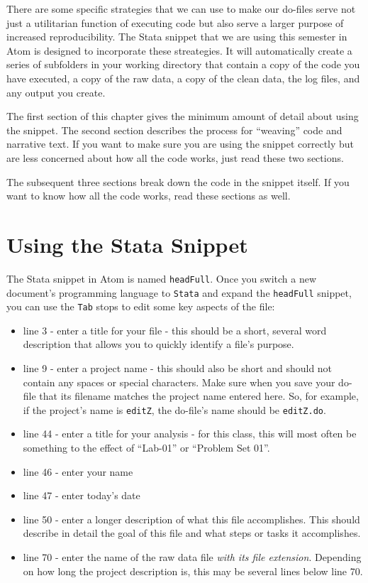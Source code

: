 \documentclass[]{book}
\providecommand{\tightlist}{%
  \setlength{\itemsep}{0pt}\setlength{\parskip}{0pt}}
\begin{document}
There are some specific strategies that we can use to make our do-files
serve not just a utilitarian function of executing code but also serve a
larger purpose of increased reproducibility. The Stata snippet that we
are using this semester in Atom is designed to incorporate these
streategies. It will automatically create a series of subfolders in your
working directory that contain a copy of the code you have executed, a
copy of the raw data, a copy of the clean data, the log files, and any
output you create.

The first section of this chapter gives the minimum amount of detail
about using the snippet. The second section describes the process for
``weaving'' code and narrative text. If you want to make sure you are
using the snippet correctly but are less concerned about how all the
code works, just read these two sections.

The subsequent three sections break down the code in the snippet itself.
If you want to know how all the code works, read these sections as well.

\section{Using the Stata Snippet}\label{using-the-stata-snippet}

The Stata snippet in Atom is named \texttt{headFull}. Once you switch a
new document's programming language to \texttt{Stata} and expand the
\texttt{headFull} snippet, you can use the \texttt{Tab} stops to edit
some key aspects of the file:

\begin{itemize}
\tightlist
\item
  line 3 - enter a title for your file - this should be a short, several
  word description that allows you to quickly identify a file's purpose.
\item
  line 9 - enter a project name - this should also be short and should
  not contain any spaces or special characters. Make sure when you save
  your do-file that its filename matches the project name entered here.
  So, for example, if the project's name is \texttt{editZ}, the
  do-file's name should be \texttt{editZ.do}.
\item
  line 44 - enter a title for your analysis - for this class, this will
  most often be something to the effect of ``Lab-01'' or ``Problem Set
  01''.
\item
  line 46 - enter your name
\item
  line 47 - enter today's date
\item
  line 50 - enter a longer description of what this file accomplishes.
  This should describe in detail the goal of this file and what steps or
  tasks it accomplishes.
\item
  line 70 - enter the name of the raw data file \emph{with its file
  extension}. Depending on how long the project description is, this may
  be several lines below line 70.
\end{itemize}
\end{document}
